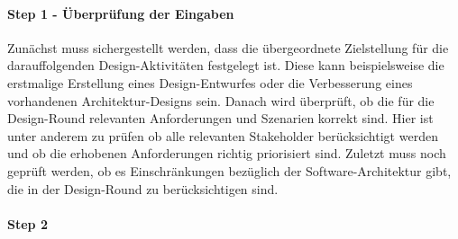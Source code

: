 \paragraph{Step 1 - Überprüfung der Eingaben}
Zunächst muss sichergestellt werden, dass die übergeordnete Zielstellung für die darauffolgenden Design-Aktivitäten festgelegt ist. Diese kann beispielsweise die erstmalige Erstellung eines Design-Entwurfes oder die Verbesserung eines vorhandenen Architektur-Designs sein. Danach wird überprüft, ob die für die Design-Round relevanten Anforderungen und Szenarien korrekt sind. Hier ist unter anderem zu prüfen ob alle relevanten Stakeholder berücksichtigt werden und ob die erhobenen Anforderungen richtig priorisiert sind. Zuletzt muss noch geprüft werden, ob es Einschränkungen bezüglich der Software-Architektur gibt, die in der Design-Round zu berücksichtigen sind.
\paragraph{Step 2}